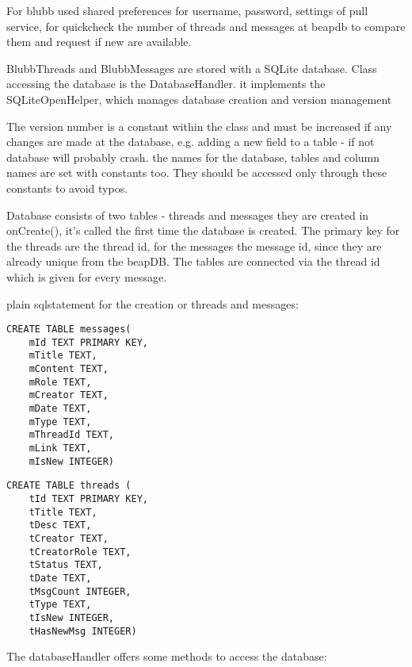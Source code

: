 \documentclass[12pt,a4paper,oneside]{report}
\begin{document}
For blubb used shared preferences for username, password, settings of pull service, for quickcheck the number of threads and messages at beapdb to compare them and request if new are available.

BlubbThreads and BlubbMessages are stored with a SQLite database. 
Class accessing the database is the DatabaseHandler.
it implements the SQLiteOpenHelper, which manages database creation and version management \citep{aDefSQLiteOpenHelper}

The version number is a constant within the class and must be increased if any changes are made at the database, e.g. adding a new field to a table - if not database will probably crash.
the names for the database, tables and column names are set with constants too. They should be accessed only through these constants to avoid typos. 

Database consists of two tables - threads and messages
they are created in onCreate(), it's called the first time the database is created. The primary key for the threads are the thread id, for the messages the message id, since they are already unique from the beapDB. The tables are connected via the thread id which is given for every message.

plain sqlstatement for the creation or threads and messages:
\lstset{language=SQL}
\begin{lstlisting}
CREATE TABLE messages(
	mId TEXT PRIMARY KEY,
	mTitle TEXT,
	mContent TEXT,
	mRole TEXT,
	mCreator TEXT,
	mDate TEXT,
	mType TEXT,
	mThreadId TEXT,
	mLink TEXT,
	mIsNew INTEGER)
\end{lstlisting}
\begin{lstlisting}
CREATE TABLE threads (
	tId TEXT PRIMARY KEY,
	tTitle TEXT,
	tDesc TEXT,
	tCreator TEXT,
	tCreatorRole TEXT,
	tStatus TEXT,
	tDate TEXT, 
	tMsgCount INTEGER,
	tType TEXT,
	tIsNew INTEGER,
	tHasNewMsg INTEGER)
\end{lstlisting}
\lstset{language=Java}

The databaseHandler offers some methods to access the database:
\end{document}
